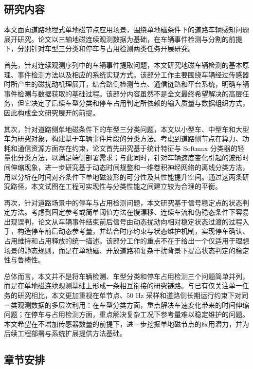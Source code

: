 \subsection{研究内容}
\label{sec:research_content}

本文面向道路地埋式单地磁节点应用场景，围绕单地磁条件下的道路车辆感知问题展开研究。论文以三轴地磁连续观测数据为基础，在车辆事件检测与分割的前提下，分别针对车型三分类和停车与占用检测两类任务开展研究。

首先，针对连续观测序列中的车辆事件提取问题，本文研究地磁车辆检测的基本原理、事件检测方法以及相应的系统实现方式。该部分工作主要围绕车辆经过传感器时所产生的磁扰动机理展开，结合路侧检测节点、通信链路和平台系统，明确车辆事件检测与数据获取的基础过程。该部分内容虽然不是全文最终希望解决的高层任务，但它决定了后续车型分类和停车占用判定所依赖的输入质量与数据组织方式，因此构成全文研究展开的前提。

其次，针对道路侧单地磁条件下的车型三分类问题，本文以小型车、中型车和大型车为研究对象，构建基于车辆事件片段的分类方法。考虑到道路侧节点在算力、功耗和通信资源方面存在约束，论文首先研究基于统计特征与 Softmax 分类器的轻量化分类方法，以满足端侧部署需求；与此同时，针对车辆速度变化引起的波形时间伸缩现象，进一步研究基于动态时间规整和一维卷积神经网络的离线分类方法，用以分析在时间对齐条件下单地磁波形的可分性及其性能提升空间。通过这两条研究路径，本文试图在工程可实现性与分类性能之间建立较为合理的平衡。

再次，针对道路场景中的停车与占用检测问题，本文研究基于信号稳定点的状态判定方法。考虑到固定参考或简单阈值方法在慢漂移、连续车流和伪稳态条件下容易出现误判，论文从车辆事件结束前后信号由动态扰动向相对稳定状态过渡的过程入手，构造停车前后动态参考量，并结合时序约束与状态维护机制，实现停车确认、占用维持和占用释放的统一描述。该部分工作的重点不在于给出一个仅适用于理想场景的静态规则，而是在单地磁、开放道路和复杂干扰背景下提高状态判定的稳定性与鲁棒性。

总体而言，本文并不是将车辆检测、车型分类和停车占用检测三个问题简单并列，而是在单地磁连续观测基础上形成一条相互衔接的研究链路。与已有仅关注单一任务的研究相比，本文更加重视在单节点、50 Hz 采样和道路侧长期运行约束下对同一类观测数据的多层次利用：在车型分类方面，重点解决车速变化带来的时间伸缩问题；在停车与占用检测方面，重点解决复杂工况下参考量难以稳定维护的问题。本文希望在不增加传感器数量的前提下，进一步挖掘单地磁节点的应用潜力，并为后续工程部署与系统扩展提供方法基础。

\subsection{章节安排}
\label{sec:thesis_organization}

